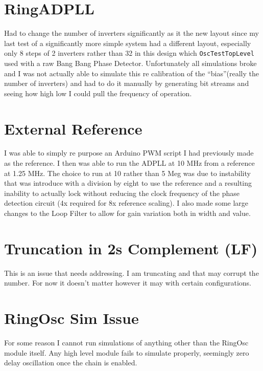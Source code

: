 \documentclass[a4paper,12pt]{report}
\begin{document}
\section*{RingADPLL}
Had to change the number of inverters significantly as it the new layout since my last test of a significantly more simple system had a different layout, especially only 8 steps of 2 inverters rather than 32 in this design which \texttt{OscTestTopLevel} used with a raw Bang Bang Phase Detector. Unfortunately all simulations broke and I was not actually able to simulate this re calibration of the ``bias''(really the number of inverters) and had to do it manually by generating bit streams and seeing how high low I could pull the frequency of operation.

\section*{External Reference}
I was able to simply re purpose an Arduino PWM script I had previously made as the reference. I then was able to run the ADPLL at 10 MHz from a reference at 1.25 MHz. The choice to run at 10 rather than 5 Meg was due to instability that was introduce with a division by eight to use the reference and a resulting inability to actually lock without reducing the clock frequency of the phase detection circuit (4x required for 8x reference scaling). I also made some large changes to the Loop Filter to allow for gain variation both in width and value.

\section*{Truncation in 2s Complement (LF)}
This is an issue that needs addressing. I am truncating and that may corrupt the number. For now it doesn't matter however it may with certain configurations.

\section*{RingOsc Sim Issue}
For some reason I cannot run simulations of anything other than the RingOsc module itself. Any high level module fails to simulate properly, seemingly zero delay oscillation once the chain is enabled.
\end{document}
